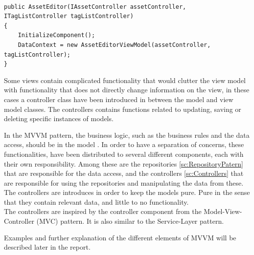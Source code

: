\begin{listing}[H]
\begin{verbatim}

public AssetEditor(IAssetController assetController, ITagListController tagListController)
{
    InitializeComponent();
    DataContext = new AssetEditorViewModel(assetController, tagListController);
}

\end{verbatim}
\label{code:AssetEditorView}
\end{listing}

Some views contain complicated functionality that would clutter the view model with functionality that does not directly change information on the view, in these cases a controller class have been introduced in between the model and view model classes. The controllers contains functions related to updating, saving or deleting specific instances of models. 
\par
In the MVVM pattern, the business logic, such as the business rules and the data access, should be in the model \citep{MvvmBasics}. 
In order to have a separation of concerns, these functionalities, have been distributed to several different components, each with their own responsibility. Among these are the repositories \autoref{sc:RepositoryPatern} that are responsible for the data access, and the controllers \autoref{sc:Controllers} that are responsible for using the repositories and manipulating the data from these.
\\
The controllers are introduces in order to keep the models pure. Pure in the sense that they contain relevant data, and little to no functionality.
\\
The controllers are inspired by the controller component from the Model-View-Controller (MVC) pattern. 
It is also similar to the Service-Layer pattern. 
\par
Examples and further explanation of the different elements of MVVM will be described later in the report. 


